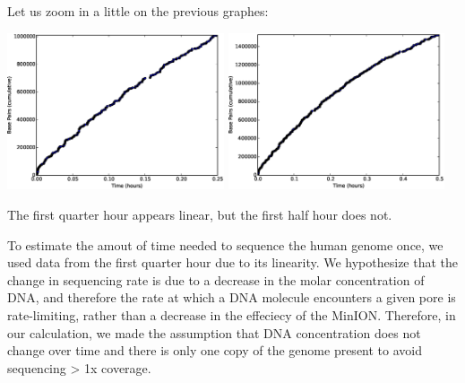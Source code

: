

Let us zoom in a little on the previous graphes: 


\includegraphics[width=0.48\textwidth]{q4qh}
\includegraphics[width=0.48\textwidth]{q4hh}

The first quarter hour appears linear, but the first half hour does not.

To estimate the amout of time needed to sequence the human genome once, 
we used data from the first quarter hour due to its linearity.  We hypothesize 
that the change in sequencing rate is due to a decrease in the molar concentration 
of DNA, and therefore the rate at which a DNA molecule encounters a given pore is 
rate-limiting, rather than a decrease in the effeciecy of the MinION.  Therefore, 
in our calculation, we made the assumption that DNA concentration does not change 
over time and there is only one copy of the genome present to avoid sequencing 
> 1x coverage. 

